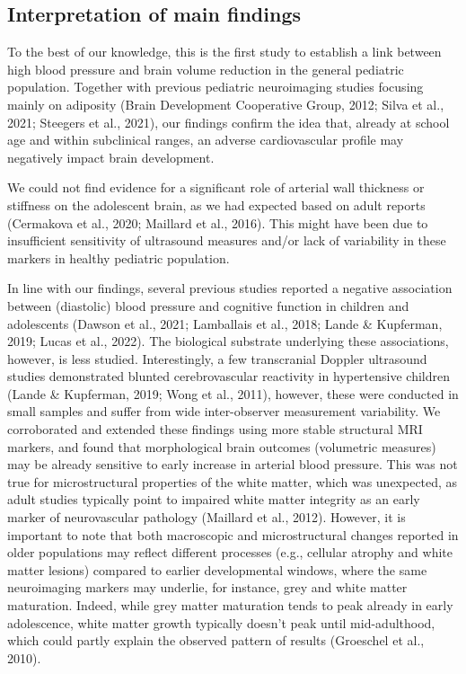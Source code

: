 \documentclass[
  letterpaper,
  DIV=11,
  numbers=noendperiod]{scrreport}
\begin{document}
\subsection{Interpretation of main
findings}\label{interpretation-of-main-findings}

To the best of our knowledge, this is the first study to establish a
link between high blood pressure and brain volume reduction in the
general pediatric population. Together with previous pediatric
neuroimaging studies focusing mainly on adiposity (Brain Development
Cooperative Group, 2012; Silva et al., 2021; Steegers et al., 2021), our
findings confirm the idea that, already at school age and within
subclinical ranges, an adverse cardiovascular profile may negatively
impact brain development.

We could not find evidence for a significant role of arterial wall
thickness or stiffness on the adolescent brain, as we had expected based
on adult reports (Cermakova et al., 2020; Maillard et al., 2016). This
might have been due to insufficient sensitivity of ultrasound measures
and/or lack of variability in these markers in healthy pediatric
population.

In line with our findings, several previous studies reported a negative
association between (diastolic) blood pressure and cognitive function in
children and adolescents (Dawson et al., 2021; Lamballais et al., 2018;
Lande \& Kupferman, 2019; Lucas et al., 2022). The biological substrate
underlying these associations, however, is less studied. Interestingly,
a few transcranial Doppler ultrasound studies demonstrated blunted
cerebrovascular reactivity in hypertensive children (Lande \& Kupferman,
2019; Wong et al., 2011), however, these were conducted in small samples
and suffer from wide inter-observer measurement variability. We
corroborated and extended these findings using more stable structural
MRI markers, and found that morphological brain outcomes (volumetric
measures) may be already sensitive to early increase in arterial blood
pressure. This was not true for microstructural properties of the white
matter, which was unexpected, as adult studies typically point to
impaired white matter integrity as an early marker of neurovascular
pathology (Maillard et al., 2012). However, it is important to note that
both macroscopic and microstructural changes reported in older
populations may reflect different processes (e.g., cellular atrophy and
white matter lesions) compared to earlier developmental windows, where
the same neuroimaging markers may underlie, for instance, grey and white
matter maturation. Indeed, while grey matter maturation tends to peak
already in early adolescence, white matter growth typically doesn't peak
until mid-adulthood, which could partly explain the observed pattern of
results (Groeschel et al., 2010).
\end{document}
